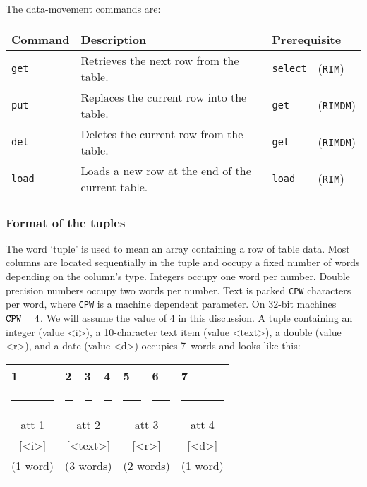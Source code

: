 \documentclass[11pt,a4paper]{report}
\def\I{\index}
\begin{document}
The data-movement commands are:
 
\medskip
\begin{tabular}{lp{12pc}ll}
Command&
Description&
\multicolumn{2}{l}{Prerequisite}\\
\hline
\verb!get! & Retrieves the next row from the table.& \verb!select!&(\verb!RIM!)\\
\verb!put!& Replaces the current row into the table.& \verb!get!&(\verb!RIMDM!)\\
\verb!del!& Deletes the current row from the table.& \verb!get!&(\verb!RIMDM!)\\
\verb!load!& Loads a new row at the end of the current table.& \verb!load!&(\verb!RIM!)
\end{tabular}
 
\medskip
 
\subsubsection{Format of the tuples}
%
\I{tuple}
The word `tuple' is used to mean an array containing a row of table data.
Most columns are located sequentially in the tuple and
occupy a fixed number of words depending on the column's type.
Integers occupy one word per number.  Double precision numbers
occupy two words per number.  Text is packed {\tt CPW}
characters per word, where {\tt CPW} is a machine dependent
parameter.  On 32-bit machines $\mbox{\tt CPW}=4$. We will
assume the value of 4 in this discussion.
A tuple containing an integer (value <i>), a 10-character text item
(value <text>),
a double (value <r>),
and a date (value <d>) occupies 7~words and looks like this:
 
\smallskip
{\centering\small{}
 \def\strut{\rule{0pt}{2pt}} \def\Strut{\rule{0pt}{12pt}}
 \def\fl{\multicolumn{1}{|l|}}
\begin{tabular}{|c|c|c|c|c|c|c|}
 \fl{1}&\fl{2}&\fl{3}&\fl{4}&\fl{5}&\fl{6}&\fl{7}\\
 \hline
   \rule{38pt}{0pt}&
   \rule{38pt}{0pt}&
   \rule{38pt}{0pt}&
   \rule{38pt}{0pt}&
   \rule{38pt}{0pt}&
   \rule{38pt}{0pt}&
   \rule{38pt}{0pt}\\
 \Strut att 1&
 \multicolumn{3}{|c|}{att 2}&
 \multicolumn{2}{|c|}{att 3}&
 att 4\\
 \Strut [<i>]&
 \multicolumn{3}{|c|}{[<text>]}&
 \multicolumn{2}{|c|}{[<r>]}&
 [<d>]\\
 \Strut (1 word)&
 \multicolumn{3}{|c|}{(3 words)}&
 \multicolumn{2}{|c|}{(2 words)}&
 (1 word)\\
 &&&&&&\\
 \hline
\end{tabular}
 \par}
 
\end{document}
